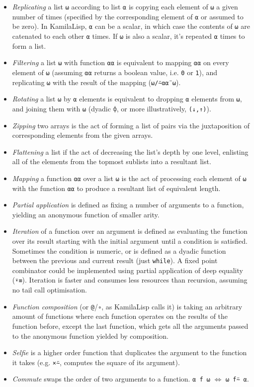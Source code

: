 \begin{itemize}
    \item \textit{Replicating} a list \verb|⍵| according to list \verb|⍺| is copying each element of \verb|⍵| a given number of times (specified by the corresponding element of \verb|⍺| or assumed to be zero). In KamilaLisp, \verb|⍺| can be a scalar, in which case the contents of \verb|⍵| are catenated to each other \verb|⍺| times. If \verb|⍵| is also a scalar, it's repeated \verb|⍺| times to form a list.
    \item \textit{Filtering} a list \verb|⍵| with function \verb|⍺⍺| is equivalent to mapping \verb|⍺⍺| on every element of \verb|⍵| (assuming \verb|⍺⍺| returns a boolean value, i.e. \verb|0| or \verb|1|), and replicating \verb|⍵| with the result of the mapping (\verb|⍵/⍨⍺⍺¨⍵|).
    \item \textit{Rotating} a list \verb|⍵| by \verb|⍺| elements is equivalent to dropping \verb|⍺| elements from \verb|⍵|, and joining them with \verb|⍵| (dyadic \verb|⌽|, or more illustratively, \verb|(↓,↑)|).
    \item \textit{Zipping} two arrays is the act of forming a list of pairs via the juxtaposition of corresponding elements from the given arrays.
    \item \textit{Flattening} a list if the act of decreasing the list's depth by one level, enlisting all of the elements from the topmost sublists into a resultant list.
    \item \textit{Mapping} a function \verb|⍺⍺| over a list \verb|⍵| is the act of processing each element of \verb|⍵| with the function \verb|⍺⍺| to produce a resultant list of equivalent length.
    \item \textit{Partial application} is defined as fixing a number of arguments to a function, yielding an anonymous function of smaller arity.
    \item \textit{Iteration} of a function over an argument is defined as evaluating the function over its result starting with the initial argument until a condition is satisfied. Sometimes the condition is numeric, or is defined as a dyadic function between the previous and current result (just \verb|while|). A fixed point combinator could be implemented using partial application of deep equality (\verb|⍣≡|). Iteration is faster and consumes less resources than recursion, assuming no tail call optimisation.
    \item \textit{Function composition} (or \verb|@|/\verb|∘|, as KamilaLisp calls it) is taking an arbitrary amount of functions where each function operates on the results of the function before, except the last function, which gets all the arguments passed to the anonymous function yielded by composition.
    \item \textit{Selfie} is a higher order function that duplicates the argument to the function it takes (e.g. \verb|×⍨|, computes the square of its argument).
    \item \textit{Commute} swaps the order of two arguments to a function. \verb|⍺ f ⍵| $\iff$ \verb|⍵ f⍨ ⍺|.
\end{itemize}
